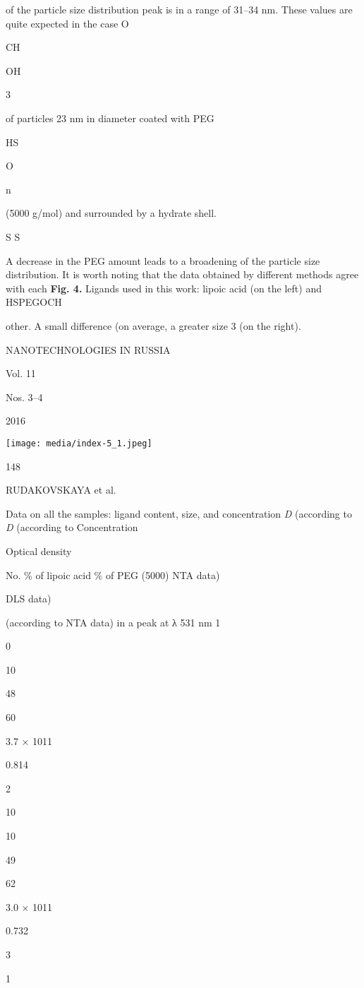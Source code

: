 \documentclass[12pt,a4paper]{article}
\begin{document}
of the particle size distribution peak is in a range of 31--34 nm. These
values are quite expected in the case O

CH

OH

3

of particles 23 nm in diameter coated with PEG

HS

O

n

(5000 g/mol) and surrounded by a hydrate shell.

S S

A decrease in the PEG amount leads to a broadening of the particle size
distribution. It is worth noting that the data obtained by different
methods agree with each \textbf{Fig. 4.} Ligands used in this work:
lipoic acid (on the left) and HSPEGOCH

other. A small difference (on average, a greater size 3 (on the right).

NANOTECHNOLOGIES IN RUSSIA

Vol. 11

Nos. 3--4

2016

\texttt{[image: media/index-5\_1.jpeg]}

148

RUDAKOVSKAYA et al.

Data on all the samples: ligand content, size, and concentration
\emph{D} (according to \emph{D} (according to Concentration

Optical density

No. \% of lipoic acid \% of PEG (5000) NTA data)

DLS data)

(according to NTA data) in a peak at λ 531 nm 1

0

10

48

60

3.7 × 1011

0.814

2

10

10

49

62

3.0 × 1011

0.732

3

1
\end{document}
